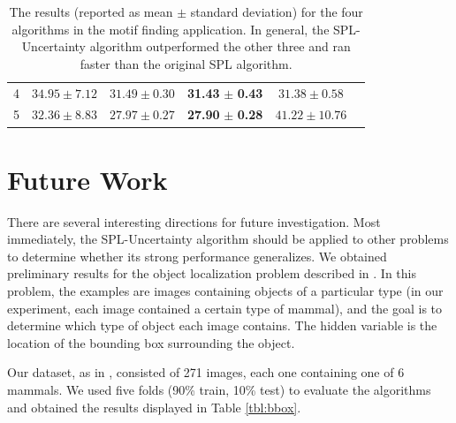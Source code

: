 \documentclass{article}
\begin{document}
\begin{table}
\begin{center}
{\begin{tabular}{|c|c|c|c|c|c|}
4 & $34.95 \pm 7.12$ & $31.49 \pm 0.30$ & \textbf{31.43} $\pm$ \textbf{0.43} & $31.38 \pm 0.58$\\
5 & $32.36 \pm 8.83$ & $27.97 \pm 0.27$ & \textbf{27.90} $\pm$ \textbf{0.28} & $41.22 \pm 10.76$\\\hline
\end{tabular}
}
\end{center}
\caption{The results (reported as mean $\pm$ standard deviation) for the four algorithms in the motif finding application. In general, the SPL-Uncertainty algorithm outperformed the other three and ran faster than the original SPL algorithm. }
\label{tbl:motif}
\end{table}


\section{Future Work}

There are several interesting directions for future investigation. Most immediately, the SPL-Uncertainty algorithm should be applied to other problems to determine whether its strong performance generalizes. We obtained preliminary results for the object localization problem described in \cite{SPL}. In this problem, the examples are images containing objects of a particular type (in our experiment, each image contained a certain type of mammal), and the goal is to determine which type of object each image contains. The hidden variable is the location of the bounding box surrounding the object. 

Our dataset, as in \cite{SPL}, consisted of 271 images, each one containing one of 6 mammals. We used five folds (90\% train, 10\% test) to evaluate the algorithms and obtained the results displayed in Table \ref{tbl:bbox}.  
\end{document}
